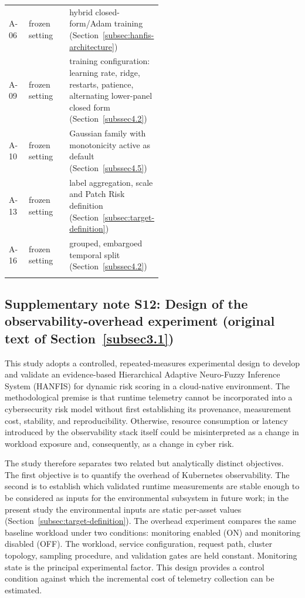\documentclass[pdflatex,sn-basic]{sn-jnl}
\theoremstyle{thmstyleone}%
\theoremstyle{thmstyletwo}%
\theoremstyle{thmstylethree}%
\begin{document}
\begin{table}[ht]
\begin{tabular}{@{}llp{0.52\linewidth}@{}}
A-06 & frozen setting & hybrid closed-form/Adam training (Section~\ref{subsec:hanfis-architecture}) \\
A-09 & frozen setting & training configuration: learning rate, ridge, restarts, patience, alternating lower-panel closed form (Section~\ref{subssec4.2}) \\
A-10 & frozen setting & Gaussian family with monotonicity active as default (Section~\ref{subssec4.5}) \\
A-13 & frozen setting & label aggregation, scale and Patch Risk definition (Section~\ref{subsec:target-definition}) \\
A-16 & frozen setting & grouped, embargoed temporal split (Section~\ref{subssec4.2}) \\
\botrule
\end{tabular}
\end{table}

\subsection*{Supplementary note S12: Design of the observability-overhead experiment (original text of Section~\ref{subsec3.1})}
This study adopts a controlled, repeated-measures experimental design to develop and validate an evidence-based Hierarchical Adaptive Neuro-Fuzzy Inference System (HANFIS) for dynamic risk scoring in a cloud-native environment. The methodological premise is that runtime telemetry cannot be incorporated into a cybersecurity risk model without first establishing its provenance, measurement cost, stability, and reproducibility. Otherwise, resource consumption or latency introduced by the observability stack itself could be misinterpreted as a change in workload exposure and, consequently, as a change in cyber risk.

The study therefore separates two related but analytically distinct objectives. The first objective is to quantify the overhead of Kubernetes observability. The second is to establish which validated runtime measurements are stable enough to be considered as inputs for the environmental subsystem in future work; in the present study the environmental inputs are static per-asset values (Section~\ref{subsec:target-definition}). The overhead experiment compares the same baseline workload under two conditions: monitoring enabled (ON) and monitoring disabled (OFF). The workload, service configuration, request path, cluster topology, sampling procedure, and validation gates are held constant. Monitoring state is the principal experimental factor. This design provides a control condition against which the incremental cost of telemetry collection can be estimated.
\end{document}
